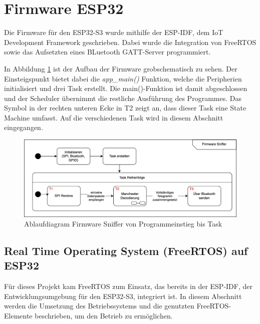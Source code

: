 

\section{Firmware ESP32}

Die Firmware für den ESP32-S3 wurde mithilfe der ESP-IDF, dem IoT Development Framework geschrieben. Dabei wurde die Integration von FreeRTOS sowie das Aufsetzten eines BLuetooth GATT-Server programmiert. 

In Abbildung \ref{fig:FSMEinleitung} ist der Aufbau der Firmware grobschematisch zu sehen. Der Einsteigspunkt bietet dabei die \textit{app\_main()} Funktion, welche die Peripherien initialisiert und drei Task erstellt. Die main()-Funktion ist damit abgeschlossen und der Scheduler übernimmt die restliche Ausführung des Programmes. Das Symbol in der rechten unteren Ecke in T2 zeigt an, dass dieser Task eine State Machine umfasst. Auf die verschiedenen Task wird in diesem Abschnitt eingegangen.

\begin{figure}[H]
    \centering
    \includegraphics[width=0.9\linewidth]{Figures/Chap3/ESP/Einleitung/FSM_Einleitung.png}
    \caption{Ablaufdiagram Firmware Sniffer von Programmeinstieg bis Task}
    \label{fig:FSMEinleitung}
\end{figure}

\subsection{Real Time Operating System (FreeRTOS) auf ESP32}


Für dieses Projekt kam FreeRTOS zum Einsatz, das bereits in der ESP-IDF, der Entwicklungsumgebung für den ESP32-S3, integriert ist. In diesem Abschnitt werden die Umsetzung des Betriebssystems und die genutzten FreeRTOS-Elemente beschrieben, um den Betrieb zu ermöglichen.

